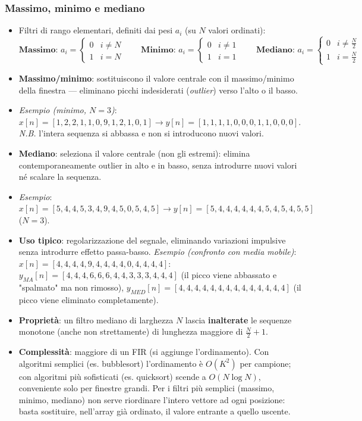 \documentclass[12pt, a4paper]{article}
\begin{document}
\subsubsection{Massimo, minimo e mediano}
\begin{itemize}
    \item Filtri di rango elementari, definiti dai pesi $a_i$ (su $N$ valori ordinati):
    $$\textbf{Massimo: } a_i=\begin{cases}0 & i\ne N\\1 & i=N\end{cases} \qquad \textbf{Minimo: } a_i=\begin{cases}0 & i\ne1\\1 & i=1\end{cases} \qquad \textbf{Mediano: } a_i=\begin{cases}0 & i\ne\frac N2\\1 & i=\frac N2\end{cases}$$
    \item \textbf{Massimo/minimo}: sostituiscono il valore centrale con il massimo/minimo della finestra — eliminano picchi indesiderati (\textit{outlier}) verso l'alto o il basso.
    \item \textit{Esempio (minimo, $N=3$)}: $x[n]=[1,2,2,1,1,0,9,1,2,1,0,1] \to y[n]=[1,1,1,1,0,0,0,1,1,0,0,0]$. \textit{N.B.} l'intera sequenza si abbassa e non si introducono nuovi valori.
    \item \textbf{Mediano}: seleziona il valore centrale (non gli estremi): elimina contemporaneamente outlier in alto e in basso, senza introdurre nuovi valori né scalare la sequenza.
    \item \textit{Esempio}: $x[n]=[5,4,4,5,3,4,9,4,5,0,5,4,5]\to y[n]=[5,4,4,4,4,4,4,5,4,5,4,5,5]$ ($N=3$).
    \item \textbf{Uso tipico}: regolarizzazione del segnale, eliminando variazioni impulsive senza introdurre effetto passa-basso. \textit{Esempio (confronto con media mobile)}: $x[n]=[4,4,4,4,9,4,4,4,4,0,4,4,4,4]$: $y_{MA}[n]=[4,4,4,6,6,6,4,4,3,3,3,4,4,4]$ (il picco viene abbassato e "spalmato" ma non rimosso), $y_{MED}[n]=[4,4,4,4,4,4,4,4,4,4,4,4,4,4]$ (il picco viene eliminato completamente).
    \item \textbf{Proprietà}: un filtro mediano di larghezza $N$ lascia \textbf{inalterate} le sequenze monotone (anche non strettamente) di lunghezza maggiore di $\frac N2+1$.
    \item \textbf{Complessità}: maggiore di un FIR (si aggiunge l'ordinamento). Con algoritmi semplici (es. bubblesort) l'ordinamento è $O(K^2)$ per campione; con algoritmi più sofisticati (es. quicksort) scende a $O(N\log N)$, conveniente solo per finestre grandi. Per i filtri più semplici (massimo, minimo, mediano) non serve riordinare l'intero vettore ad ogni posizione: basta sostituire, nell'array già ordinato, il valore entrante a quello uscente.
\end{itemize}
\end{document}
